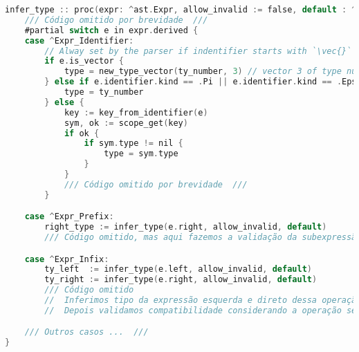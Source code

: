 \begin{codigo}[htb]
    \caption{\small Parte do switch da inferencia de tipos. }
    \label{cod-type-inference}
\begin{lstlisting}[language=C, frame=none, inputencoding=utf8]
infer_type :: proc(expr: ^ast.Expr, allow_invalid := false, default : ^ast.Type = ast.ty_invalid ) -> ^Type {
    /// Código omitido por brevidade  ///
    #partial switch e in expr.derived {
    case ^Expr_Identifier:
        // Alway set by the parser if indentifier starts with `\vec{}`
        if e.is_vector {
            type = new_type_vector(ty_number, 3) // vector 3 of type number (real)
        } else if e.identifier.kind == .Pi || e.identifier.kind == .Epsilon {
            type = ty_number
        } else {
            key := key_from_identifier(e)
            sym, ok := scope_get(key)
            if ok {
                if sym.type != nil {
                    type = sym.type
                }
            }
            /// Código omitido por brevidade  ///
        }

    case ^Expr_Prefix:
        right_type := infer_type(e.right, allow_invalid, default)
        /// Código omitido, mas aqui fazemos a validação da subexpressão direita e atribuimos o tipo correto para Expr_Prefix   ///

    case ^Expr_Infix:
        ty_left  := infer_type(e.left, allow_invalid, default)
        ty_right := infer_type(e.right, allow_invalid, default)
        /// Código omitido
        //  Inferimos tipo da expressão esquerda e direto dessa operação binária
        //  Depois validamos compatibilidade considerando a operação sendo usada nessas duas expressões

    /// Outros casos ...  ///
}
\end{lstlisting}
\end{codigo}
